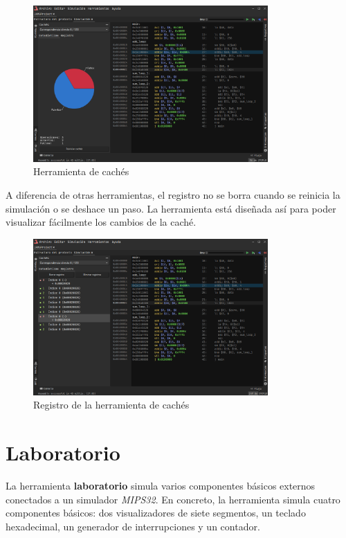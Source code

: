\begin{figure}[H]
    \centering
    \includegraphics[width=0.8\textwidth]{images/tools/jams-caches}
    \caption{Herramienta de cachés}
    \label{fig:jams-caches-stats}
\end{figure}

A diferencia de otras herramientas, el registro no se
borra cuando se reinicia la simulación o se deshace un paso.
La herramienta está diseñada así para poder visualizar fácilmente los cambios de la caché.

\begin{figure}[H]
    \centering
    \includegraphics[width=0.8\textwidth]{images/tools/jams-caches-log}
    \caption{Registro de la herramienta de cachés}
    \label{fig:jams-caches-log}
\end{figure}

\section{Laboratorio}\label{sec:laboratorio}

La herramienta \textbf{laboratorio} simula varios componentes básicos
externos conectados a un simulador \textit{MIPS32}.
En concreto, la herramienta simula cuatro componentes básicos:
dos visualizadores de siete segmentos, un teclado hexadecimal,
un generador de interrupciones y un contador.

